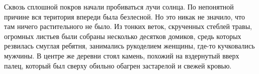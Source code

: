 Сквозь сплошной покров начали пробиваться лучи солнца.
По непонятной причине вся територия впереди была безлесной.
Но это никак не значило, что там ничего растительного не было.
Из тонких веток, скрученных стеблей травы, огромных листьев были собраны несколько десятков домиков, средь которых резвилась смуглая ребятня, занимались рукоделием женщины, где-то кучковались мужчины. В центре же деревни стоял камень, похожий на вздернутый вверх палец, который был сверху обильно обагрен застарелой и свежей кровью.